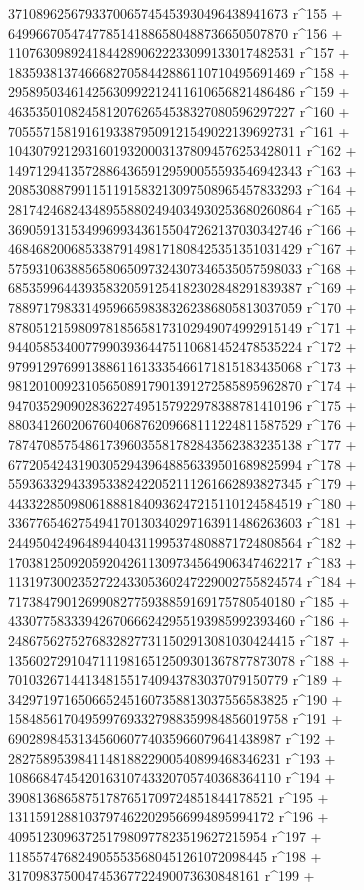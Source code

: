        3710896256793370065745453930496438941673 r^155 + 
       6499667054747785141886580488736650507870 r^156 + 
       11076309892418442890622233099133017482531 r^157 + 
       18359381374666827058442886110710495691469 r^158 + 
       29589503461425630992212411610656821486486 r^159 + 
       46353501082458120762654538327080596297227 r^160 + 
       70555715819161933879509121549022139692731 r^161 + 
       104307921293160193200031378094576253428011 r^162 + 
       149712941357288643659129590055593546942343 r^163 + 
       208530887991151191583213097508965457833293 r^164 + 
       281742468243489558802494034930253680260864 r^165 + 
       369059131534996993436155047262137030342746 r^166 + 
       468468200685338791498171808425351351031429 r^167 + 
       575931063885658065097324307346535057598033 r^168 + 
       685359964439358320591254182302848291839387 r^169 + 
       788971798331495966598383262386805813037059 r^170 + 
       878051215980978185658173102949074992915149 r^171 + 
       944058534007799039364475110681452478535224 r^172 + 
       979912976991388611613335466171815183435068 r^173 + 
       981201009231056508917901391272585895962870 r^174 + 
       947035290902836227495157922978388781410196 r^175 + 
       880341260206760406876209668111224811587529 r^176 + 
       787470857548617396035581782843562383235138 r^177 + 
       677205424319030529439648856339501689825994 r^178 + 
       559363329433953382422052111261662893827345 r^179 + 
       443322850980618881840936247215110124584519 r^180 + 
       336776546275494170130340297163911486263603 r^181 + 
       244950424964894404311995374808871724808564 r^182 + 
       170381250920592042611309734564906347462217 r^183 + 
       113197300235272243305360247229002755824574 r^184 + 
       71738479012699082775938859169175780540180 r^185 + 
       43307758333942670666242955193985992393460 r^186 + 
       24867562752768328277311502913081030424415 r^187 + 
       13560272910471119816512509301367877873078 r^188 + 
       7010326714413481551740943783037079150779 r^189 + 
       3429719716506652451607358813037556583825 r^190 + 
       1584856170495997693327988359984856019758 r^191 + 
       690289845313456060774035966079641438987 r^192 + 
       282758953984114818822900540899468346231 r^193 + 
       108668474542016310743320705740368364110 r^194 + 
       39081368658751787651709724851844178521 r^195 + 
       13115912881037974622029566994895994172 r^196 + 
       4095123096372517980977823519627215954 r^197 + 
       1185574768249055535680451261072098445 r^198 + 
       317098375004745367722490073630848161 r^199 + 
